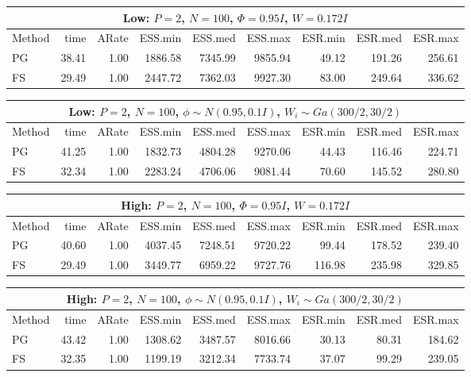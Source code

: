 \documentclass[11pt]{article}
\begin{document}
\begin{table}
\begin{tabular}{l r r r r r r r r } 
\hline
\multicolumn{9}{c}{Low: $P=2$, $N=100$, $\Phi = 0.95I$, $W=0.172 I$} \\
\hline
          Method  &    time  &   ARate  &  ESS.min  &  ESS.med  &  ESS.max  &  ESR.min  &  ESR.med  &  ESR.max  \\ 
             PG   &    38.41 &     1.00 &   1886.58 &   7345.99 &   9855.94 &     49.12 &    191.26 &    256.61 \\ 
             FS   &    29.49 &     1.00 &   2447.72 &   7362.03 &   9927.30 &     83.00 &    249.64 &    336.62
 \end{tabular}

\begin{tabular}{l r r r r r r r r } 
\hline
\multicolumn{9}{c}{Low: $P=2$, $N=100$, $\phi \sim N(0.95, 0.1 I)$, $W_i \sim Ga(300/2, 30/2)$} \\
\hline
          Method  &    time  &   ARate  &  ESS.min  &  ESS.med  &  ESS.max  &  ESR.min  &  ESR.med  &  ESR.max  \\ 
             PG   &    41.25 &     1.00 &   1832.73 &   4804.28 &   9270.06 &     44.43 &    116.46 &    224.71 \\ 
             FS   &    32.34 &     1.00 &   2283.24 &   4706.06 &   9081.44 &     70.60 &    145.52 &    280.80
 \end{tabular}

\begin{tabular}{l r r r r r r r r } 
\hline
\multicolumn{9}{c}{High: $P=2$, $N=100$, $\Phi = 0.95I$, $W=0.172 I$} \\
\hline
          Method  &    time  &   ARate  &  ESS.min  &  ESS.med  &  ESS.max  &  ESR.min  &  ESR.med  &  ESR.max  \\ 
             PG   &    40.60 &     1.00 &   4037.45 &   7248.51 &   9720.22 &     99.44 &    178.52 &    239.40 \\ 
             FS   &    29.49 &     1.00 &   3449.77 &   6959.22 &   9727.76 &    116.98 &    235.98 &    329.85
 \end{tabular}

\begin{tabular}{l r r r r r r r r } 
\hline
\multicolumn{9}{c}{High: $P=2$, $N=100$, $\phi \sim N(0.95, 0.1 I)$, $W_i \sim Ga(300/2, 30/2)$} \\
\hline
          Method  &    time  &   ARate  &  ESS.min  &  ESS.med  &  ESS.max  &  ESR.min  &  ESR.med  &  ESR.max  \\ 
             PG   &    43.42 &     1.00 &   1308.62 &   3487.57 &   8016.66 &     30.13 &     80.31 &    184.62 \\ 
             FS   &    32.35 &     1.00 &   1199.19 &   3212.34 &   7733.74 &     37.07 &     99.29 &    239.05
 \end{tabular}


\end{table}
\end{document}
